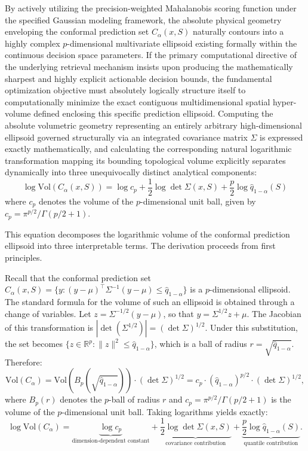 \documentclass[12pt,a4paper,oneside]{report}
\theoremstyle{definition}
\theoremstyle{remark}
\begin{document}
By actively utilizing the precision-weighted Mahalanobis scoring function under the specified Gaussian modeling framework, the absolute physical geometry enveloping the conformal prediction set $C_{\alpha}(x, S)$ naturally contours into a highly complex $p$-dimensional multivariate ellipsoid existing formally within the continuous decision space parameters. If the primary computational directive of the underlying retrieval mechanism insists upon producing the mathematically sharpest and highly explicit actionable decision bounds, the fundamental optimization objective must absolutely logically structure itself to computationally minimize the exact contiguous multidimensional spatial hyper-volume defined enclosing this specific prediction ellipsoid. Computing the absolute volumetric geometry representing an entirely arbitrary high-dimensional ellipsoid governed structurally via an integrated covariance matrix $\Sigma$ is expressed exactly mathematically, and calculating the corresponding natural logarithmic transformation mapping its bounding topological volume explicitly separates dynamically into three unequivocally distinct analytical components:
\begin{equation} \label{eq:log_volume}
\log \text{Vol}(C_{\alpha}(x, S)) = \log c_p + \frac{1}{2} \log \det \Sigma(x, S) + \frac{p}{2} \log \hat{q}_{1-\alpha}(S)
\end{equation}
where $c_p$ denotes the volume of the $p$-dimensional unit ball, given by $c_p = \pi^{p/2} / \Gamma(p/2 + 1)$.

\medskip
\noindent This equation decomposes the logarithmic volume of the conformal prediction ellipsoid into three interpretable terms. The derivation proceeds from first principles.

Recall that the conformal prediction set $C_{\alpha}(x, S) = \{y : (y - \mu)^\top \Sigma^{-1} (y - \mu) \leq \hat{q}_{1-\alpha}\}$ is a $p$-dimensional ellipsoid. The standard formula for the volume of such an ellipsoid is obtained through a change of variables. Let $z = \Sigma^{-1/2}(y - \mu)$, so that $y = \Sigma^{1/2} z + \mu$. The Jacobian of this transformation is $|\det(\Sigma^{1/2})| = (\det \Sigma)^{1/2}$. Under this substitution, the set becomes $\{z \in \mathbb{R}^p : \|z\|^2 \leq \hat{q}_{1-\alpha}\}$, which is a ball of radius $r = \sqrt{\hat{q}_{1-\alpha}}$. Therefore:
\[
\text{Vol}(C_{\alpha}) = \text{Vol}\left(B_p\left(\sqrt{\hat{q}_{1-\alpha}}\right)\right) \cdot (\det \Sigma)^{1/2}
= c_p \cdot \left(\hat{q}_{1-\alpha}\right)^{p/2} \cdot (\det \Sigma)^{1/2},
\]
where $B_p(r)$ denotes the $p$-ball of radius $r$ and $c_p = \pi^{p/2}/\Gamma(p/2+1)$ is the volume of the $p$-dimensional unit ball. Taking logarithms yields exactly:
\[
\log \text{Vol}(C_{\alpha}) = \underbrace{\log c_p}_{\text{dimension-dependent constant}} + \underbrace{\frac{1}{2} \log \det \Sigma(x,S)}_{\text{covariance contribution}} + \underbrace{\frac{p}{2} \log \hat{q}_{1-\alpha}(S)}_{\text{quantile contribution}}.
\]
\end{document}
